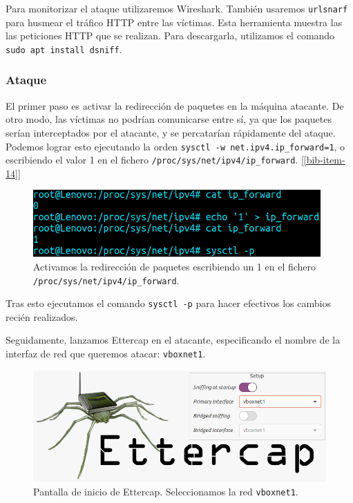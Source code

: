 \documentclass[11pt]{article}
\begin{document}
Para monitorizar el ataque utilizaremos Wireshark. También usaremos \texttt{urlsnarf} para husmear el tráfico HTTP entre las víctimas. Esta
herramienta muestra las las peticiones HTTP que se realizan. Para descargarla, utilizamos el comando \verb^sudo apt install dsniff^.

\subsubsection*{Ataque}

El primer paso es activar la redirección de paquetes en la máquina atacante. De otro modo, las víctimas no podrían comunicarse entre sí, ya
que los paquetes serían interceptados por el atacante, y se percatarían rápidamente del ataque. Podemos lograr esto ejecutando la orden
\verb|sysctl -w net.ipv4.ip_forward=1|, o escribiendo el valor 1 en el fichero \texttt{/proc/sys/net/ipv4/ip\_forward}. [\ref{bib-item-14}]

\begin{figure}[H]
	\centering
	\includegraphics[width=110mm]{images/ip_forward}
	\caption{Activamos la redirección de paquetes escribiendo un 1 en el fichero \texttt{/proc/sys/net/ipv4/ip\_forward}.}
	\label{fig:ip_forward}
\end{figure}

Tras esto ejecutamos el comando \verb|sysctl -p| para hacer efectivos los cambios recién realizados.

Seguidamente, lanzamos Ettercap en el atacante, especificando el nombre de la interfaz de red que queremos atacar: \texttt{vboxnet1}.

\begin{figure}[H]
	\centering
	\includegraphics[width=140mm]{images/ettercap-start}
	\caption{Pantalla de inicio de Ettercap. Seleccionamos la red \texttt{vboxnet1}.}
	\label{fig:ettercap-start}
\end{figure}
\end{document}

